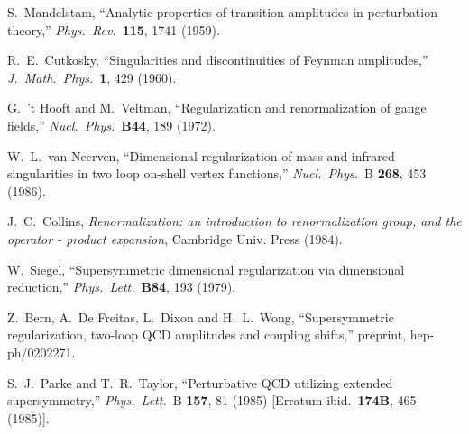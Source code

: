 \begin{thebibliography}{99}
S.~Mandelstam,
``Analytic properties of transition amplitudes in perturbation theory,''
{\it Phys.\ Rev.}\  {\bf 115}, 1741 (1959).

R.~E.~Cutkosky,
``Singularities and discontinuities of Feynman amplitudes,''
{\it J.\ Math.\ Phys.}\  {\bf 1}, 429 (1960).

G.~'t Hooft and M.~Veltman,
``Regularization and renormalization of gauge fields,''
{\it Nucl.\ Phys.}\ {\bf B44}, 189 (1972).

W.~L.~van Neerven,
``Dimensional regularization of mass and infrared singularities 
in two loop on-shell vertex functions,''
{\it Nucl.\ Phys.}\ B {\bf 268}, 453 (1986).

J.~C.~Collins, {\it Renormalization: an introduction to renormalization group,
   and the operator - product expansion},  Cambridge
   Univ. Press (1984).

W.~Siegel,
``Supersymmetric dimensional regularization via dimensional reduction,''
{\it Phys.\ Lett.}\  {\bf B84}, 193 (1979).

Z.~Bern, A.~De Freitas, L.~Dixon and H.~L.~Wong,
``Supersymmetric regularization, two-loop QCD amplitudes and 
coupling  shifts,''
preprint, hep-ph/0202271.

S.~J.~Parke and T.~R.~Taylor,
``Perturbative QCD utilizing extended supersymmetry,''
{\it Phys.\ Lett.}\ B {\bf 157}, 81 (1985)
[Erratum-ibid.\  {\bf 174B}, 465 (1985)].


\end{thebibliography}
